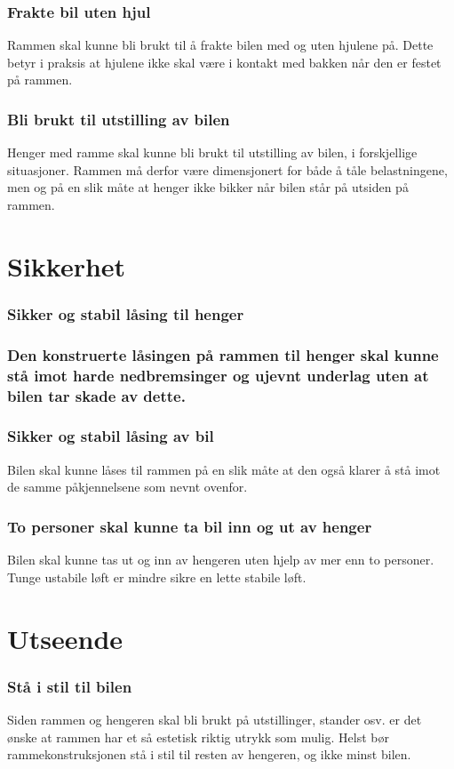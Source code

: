 \subsubsection{Frakte bil uten hjul}
Rammen skal kunne bli brukt til å frakte bilen med og uten hjulene på. Dette betyr i praksis at hjulene ikke skal være i kontakt med bakken når den er festet på rammen. 
\subsubsection{Bli brukt til utstilling av bilen}
Henger med ramme skal kunne bli brukt til utstilling av bilen, i forskjellige situasjoner. Rammen må derfor være dimensjonert for både å tåle belastningene, men og på en slik måte at henger ikke bikker når bilen står på utsiden på rammen.
\section{Sikkerhet}
\subsubsection{Sikker og stabil låsing til henger}
\subsubsection{Den konstruerte låsingen på rammen til henger skal kunne stå imot harde nedbremsinger og ujevnt underlag uten at bilen tar skade av dette.  }
\subsubsection{Sikker og stabil låsing av bil}
Bilen skal kunne låses til rammen på en slik måte at den også klarer å stå imot de samme påkjennelsene som nevnt ovenfor.
\subsubsection{To personer skal kunne ta bil inn og ut av henger}
Bilen skal kunne tas ut og inn av hengeren uten hjelp av mer enn to personer. Tunge ustabile løft er mindre sikre en lette stabile løft.  
\section{Utseende}
\subsubsection{Stå i stil til bilen}
Siden rammen og hengeren skal bli brukt på utstillinger, stander osv. er det ønske at rammen har et så estetisk riktig utrykk som mulig. Helst bør rammekonstruksjonen stå i stil til resten av hengeren, og ikke minst bilen. 
